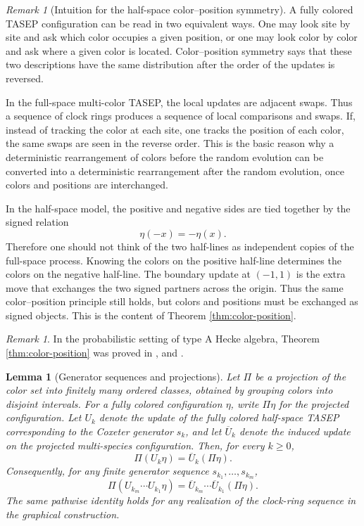 \documentclass[12pt,a4paper]{amsart}
\newtheorem{lemma}[theorem]{Lemma}
\theoremstyle{remark}
\newtheorem{remark}[theorem]{Remark}
\numberwithin{equation}{section} \numberwithin{theorem}{section}
\begin{document}
\begin{remark}[Intuition for the half-space color--position symmetry]
\label{rmk:intuition-color-position}
A fully colored TASEP configuration can be read in two equivalent ways. 
One may look site by site and ask which color occupies a given position, or one may look color by color and ask where a given color is located. 
Color--position symmetry says that these two descriptions have the same distribution after the order of the updates is reversed.

In the full-space multi-color TASEP, the local updates are adjacent swaps. 
Thus a sequence of clock rings produces a sequence of local comparisons and swaps. 
If, instead of tracking the color at each site, one tracks the position of each color, the same swaps are seen in the reverse order. 
This is the basic reason why a deterministic rearrangement of colors before the random evolution can be converted into a deterministic rearrangement after the random evolution, once colors and positions are interchanged.

In the half-space model, the positive and negative sides are tied together by the signed relation
\[
\eta(-x)=-\eta(x).
\]
Therefore one should not think of the two half-lines as independent copies of the full-space process. 
Knowing the colors on the positive half-line determines the colors on the negative half-line. 
The boundary update at $(-1,1)$ is the extra move that exchanges the two signed partners across the origin. 
Thus the same color--position principle still holds, but colors and positions must be exchanged as signed objects. 
This is the content of Theorem \ref{thm:color-position}.
\end{remark}

\begin{remark}
In the probabilistic setting of type A Hecke algebra, Theorem \ref{thm:color-position} was proved in \cite[Theorem 1.4]{AAV11}, \cite[Theorem 3.1]{BB21} and \cite[Proposition 2.3]{BF22}.
\end{remark}

\begin{lemma}[Generator sequences and projections]
\label{lem:generator-projection}
Let $\Pi$ be a projection of the color set into finitely many ordered classes, obtained by grouping colors into disjoint intervals. 
For a fully colored configuration $\eta$, write $\Pi\eta$ for the projected configuration. 
Let $U_k$ denote the update of the fully colored half-space TASEP corresponding to the Coxeter generator $s_k$, and let $\overline U_k$ denote the induced update on the projected multi-species configuration. 
Then, for every $k\geq 0$,
\[
\Pi(U_k\eta)=\overline U_k(\Pi\eta).
\]
Consequently, for any finite generator sequence $s_{k_1},\ldots,s_{k_m}$,
\[
\Pi(U_{k_m}\cdots U_{k_1}\eta)
=
\overline U_{k_m}\cdots \overline U_{k_1}(\Pi\eta).
\]
The same pathwise identity holds for any realization of the clock-ring sequence in the graphical construction.
\end{lemma}
\end{document}
